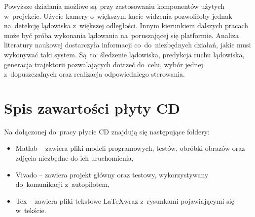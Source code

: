 Powyższe działania możliwe są~przy zastosowaniu komponentów użytych w~projekcie. 
Użycie kamery o~większym kącie widzenia pozwoliłoby jednak na~detekcję lądowiska z~większej odległości.
Innym kierunkiem dalszych pracach może być próba wykonania lądowania na~poruszającej się platformie. 
Analiza literatury naukowej dostarczyła informacji co~do~niezbędnych działań, jakie musi wykonywać taki system. 
Są~to: śledzenie lądowiska, predykcja ruchu lądowiska, generacja trajektorii pozwalających dotrzeć do~celu, wybór jednej z~dopuszczalnych oraz realizacja odpowiedniego sterowania.

\appendix
\chapter{Spis zawartości płyty CD}
Na dołączonej do~pracy płycie CD znajdują się następujące foldery:
\begin{itemize}
	\item Matlab -- zawiera pliki modeli programowych, testów, obróbki obrazów oraz zdjęcia niezbędne do ich uruchomienia,
	\item Vivado -- zawiera projekt główny oraz testowy, wykorzystywany do~komunikacji z~autopilotem,
	\item Tex -- zawiera pliki tekstowe \LaTeX wraz z~rysunkami pojawiającymi się w~tekście.
\end{itemize}
